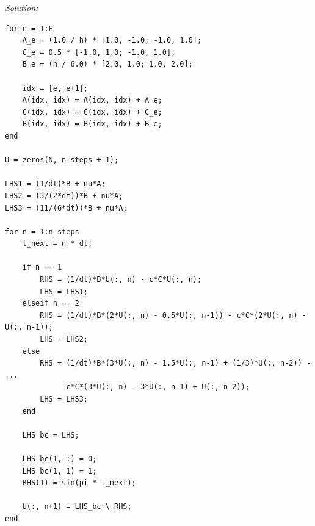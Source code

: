 \documentclass[11pt]{article}
\newenvironment{solution}
    {\textit{Solution:}}
    {}
\begin{document}
\begin{solution}
\begin{lstlisting}
for e = 1:E
    A_e = (1.0 / h) * [1.0, -1.0; -1.0, 1.0];
    C_e = 0.5 * [-1.0, 1.0; -1.0, 1.0];
    B_e = (h / 6.0) * [2.0, 1.0; 1.0, 2.0];

    idx = [e, e+1];
    A(idx, idx) = A(idx, idx) + A_e;
    C(idx, idx) = C(idx, idx) + C_e;
    B(idx, idx) = B(idx, idx) + B_e;
end

U = zeros(N, n_steps + 1);

LHS1 = (1/dt)*B + nu*A;
LHS2 = (3/(2*dt))*B + nu*A;
LHS3 = (11/(6*dt))*B + nu*A;

for n = 1:n_steps
    t_next = n * dt;

    if n == 1
        RHS = (1/dt)*B*U(:, n) - c*C*U(:, n);
        LHS = LHS1;
    elseif n == 2
        RHS = (1/dt)*B*(2*U(:, n) - 0.5*U(:, n-1)) - c*C*(2*U(:, n) - U(:, n-1));
        LHS = LHS2;
    else
        RHS = (1/dt)*B*(3*U(:, n) - 1.5*U(:, n-1) + (1/3)*U(:, n-2)) - ...
              c*C*(3*U(:, n) - 3*U(:, n-1) + U(:, n-2));
        LHS = LHS3;
    end

    LHS_bc = LHS;

    LHS_bc(1, :) = 0;
    LHS_bc(1, 1) = 1;
    RHS(1) = sin(pi * t_next);

    U(:, n+1) = LHS_bc \ RHS;
end
\end{lstlisting}

\end{solution}
\end{document}
